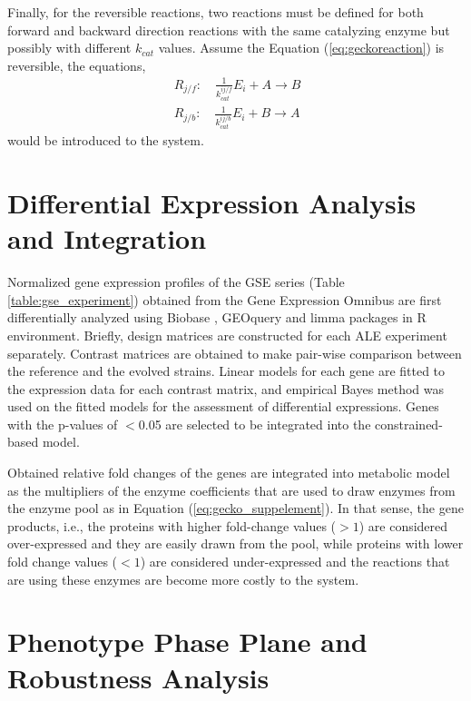 Finally, for the reversible reactions, two reactions must be defined for both forward and backward direction reactions with the same catalyzing enzyme but possibly with different $k_{cat}$ values. Assume the Equation (\ref{eq:geckoreaction}) is reversible, the equations,
\begin{align}
 \label{eq:gecko_reversible}
 \ R_{j/f}: \quad \frac{1}{k_{cat}^{ij/f}}E_i + A \to B \\
 \ R_{j/b}: \quad \frac{1}{k_{cat}^{ij/b}}E_i + B \to A
\end{align}
would be introduced to the system.

\section{Differential Expression Analysis and Integration}
Normalized gene expression profiles of the GSE series (Table \ref{table:gse_experiment}) obtained from the Gene Expression Omnibus are first differentially analyzed using Biobase \cite{huber2015orchestrating}, GEOquery \cite{davis2007geoquery} and limma \cite{ritchie2015limma} packages in R environment. Briefly, design matrices are constructed for each ALE experiment separately. Contrast matrices are obtained to make pair-wise comparison between the reference and the evolved strains. Linear models for each gene are fitted to the expression data for each contrast matrix, and empirical Bayes method was used on the fitted models for the assessment of differential expressions. Genes with the p-values of $<$0.05 are selected to be integrated into the constrained-based model.

\vspace{-0.5cm}



\vspace{-1cm}

Obtained relative fold changes of the genes are integrated into metabolic model as the multipliers of the enzyme coefficients that are used to draw enzymes from the enzyme pool as in Equation (\ref{eq:gecko_suppelement}). In that sense, the gene products, i.e., the proteins with higher fold-change values ($>1$) are considered over-expressed and they are easily drawn from the pool, while proteins with lower fold change values ($<1$) are considered under-expressed and the reactions that are using these enzymes are become more costly to the system.



\section{Phenotype Phase Plane and Robustness Analysis}

